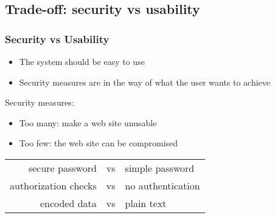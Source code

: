 \subsection{Trade-off: security vs usability}

\begin{frame}
\frametitle{Security vs Usability}
\begin{itemize}
\item The system should be easy to use
\item Security measures are in the way of what the user wants to achieve
\end{itemize}
Security measures:
\begin{itemize}
\item Too many: make a web site unusable
\item Too few: the web site can be compromised
\end{itemize}
\begin{example}
\begin{center}
\begin{tabular}{rcl}
secure password & vs & simple password \\
authorization checks & vs & no authentication \\
encoded data & vs & plain text \\
\end{tabular}
\end{center}
\end{example}
\end{frame}

